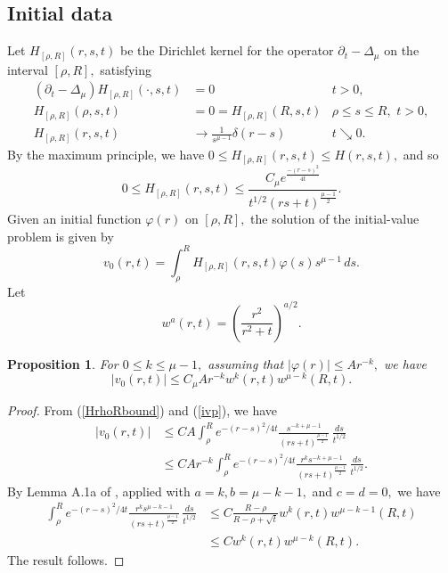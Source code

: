 \documentclass[12pt]{amsart}
\newcommand{\LB}{\left[}
\newcommand{\RB}{\right]}
\newtheorem{prop}[thm]{Proposition}
\theoremstyle{others}
\numberwithin{equation}{section}
\newcommand{\p}{\partial}
\begin{document}
\subsection{Initial data}\label{app:initialkernel} Let $H_{\LB \rho, R \RB}(r,s,t)$ be the Dirichlet kernel for the operator $\p_t - \Delta_\mu$ on the interval $\LB \rho, R\RB,$ satisfying
\begin{align*}
\left( \p_t - \Delta_\mu \right) H_{\LB \rho, R\RB}(\cdot, s,t) & = 0 & t > 0, \\
H_{\LB \rho, R\RB}(\rho, s,t) & = 0 = H_{\LB \rho, R\RB} (R, s,t) &  \rho \leq s \leq R , \,\, t > 0, \\
H_{\LB \rho, R\RB}(r, s,t) & \to \frac{1}{s^{\mu - 1}} \delta(r - s) &  t \searrow 0.
\end{align*}
By the maximum principle, we have $0 \leq H_{\LB \rho, R \RB}(r,s,t) \leq H(r,s,t),$ and so
\begin{equation}\label{HrhoRbound}
0 \leq H_{\LB \rho , R \RB} (r,s,t) \leq \frac{C_\mu e^{\frac{-(r-s)^2}{4t}}}{t^{1/2} (rs + t)^{\frac{\mu-1}{2}} }.
\end{equation}
Given an initial function $\varphi(r)$ on $\LB \rho, R \RB,$ the solution of the initial-value problem is given by
\begin{equation}\label{ivp}
v_0(r,t) = \int_\rho^R H_{\LB \rho , R \RB} (r,s,t) \varphi(s) s^{\mu - 1} \, ds.
\end{equation}
Let
$$w^a(r,t) = \left( \frac{r^2}{r^2 + t} \right)^{a/2}.$$

\begin{prop}\label{initialestimate} For $0 \leq k \leq \mu - 1,$ assuming that $|\varphi(r) | \leq A r^{-k},$ we have
\begin{equation*}
|v_0(r,t)| \leq C_\mu A r^{-k} w^{k}(r,t) w^{\mu - k}(R,t).
\end{equation*}
\end{prop}
\begin{proof} From (\ref{HrhoRbound}) and (\ref{ivp}), we have
\begin{equation*}
\begin{split}
|v_0(r,t)| & \leq C A \int_\rho^R e^{-(r-s)^2/4t} \frac{s^{-k + \mu -1}}{(rs + t)^{\frac{\mu -1}{2}}} \, \frac{ds}{t^{1/2}} \\
& \leq CA r^{-k} \int_\rho^R e^{-(r-s)^2/4t} \frac{r^{k} s^{-k + \mu - 1}}{(rs + t)^{\frac{\mu -1}{2}}} \, \frac{ds}{t^{1/2}}.
\end{split}
\end{equation*}
By Lemma A.1a of \cite{lte}, applied with $a = k, b= \mu - k -1,$ and $c = d = 0,$ we have
\begin{equation*}
\begin{split}
\int_\rho^R e^{-(r-s)^2/4t} \frac{r^{k} s^{\mu - k - 1}}{(rs + t)^{\frac{\mu -1}{2}}} \, \frac{ds}{t^{1/2}} & \leq C \frac{ R - \rho}{R - \rho + \sqrt{t} } w^{k}(r,t) w^{\mu - k - 1}(R,t) \\
& \leq C w^{k}(r,t) w^{\mu - k}(R,t).
\end{split}
\end{equation*}
The result follows.
\end{proof}
\end{document}
